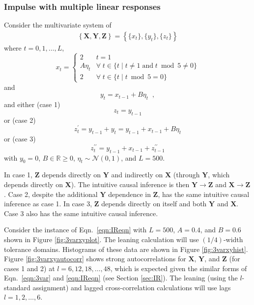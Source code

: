 \documentclass{article}[10pt]
\begin{document}
\subsubsection{Impulse with multiple linear responses}
\label{sec:3var}
Consider the multivariate system of
\begin{eqnarray}
\label{eqn:3var}
\left\{\mathbf{X},\mathbf{Y},\mathbf{Z}\right\} = \left\{\{x_t\},\{y_t\},\{z_t\}\right\}
\end{eqnarray}
where $t=0,1,\ldots,L$,
\begin{equation*}
x_t = \left\{
  \begin{array}{lr}
    2 & t = 1\\
    A\eta_t & \forall\; t\in\{t\;|\;t\neq 1 \;\mathrm{and}\; t\bmod 5 \neq 0\}\\
    2 & \forall\; t\in\{t\;|\;t\bmod 5 = 0\}
  \end{array}
\right.
\end{equation*}
and
\begin{equation*}
y_t = x_{t-1} + B\eta_t\;\;,
\end{equation*}
and either (case 1)
\begin{equation}
z_t = y_{t-1}
\end{equation}
or (case 2)
\begin{equation}
z_t^\prime = y_{t-1} + y_t = y_{t-1} + x_{t-1} + B\eta_t
\end{equation}
or (case 3)
\begin{equation}
z_t^{\prime\prime} = y_{t-1} + x_{t-1} + z_{t-1}^{\prime\prime}
\end{equation}
with $y_0 = 0$, $B\in\mathbb{R}\ge 0$, $\eta_t\sim\mathcal{N}\left(0,1\right)$, and $L=500$.

In case 1, $\mathbf{Z}$ depends directly on $\mathbf{Y}$ and indirectly on $\mathbf{X}$ (through $\mathbf{Y}$, which depends directly on $\mathbf{X}$).  The intuitive causal inference is then $\mathbf{Y}\rightarrow\mathbf{Z}$ and $\mathbf{X}\rightarrow\mathbf{Z}$.  Case 2, despite the additional $\mathbf{Y}$ dependence in $\mathbf{Z}$, has the same intuitive causal inference as case 1.  In case 3, $\mathbf{Z}$ depends directly on itself and both $\mathbf{Y}$ and $\mathbf{X}$.  Case 3 also has the same intuitive causal inference.

Consider the instance of Eqn.\ \ref{eqn:IReqn} with $L=500$, $A=0.4$, and $B=0.6$ shown in Figure \ref{fig:3varxyplot}.  The leaning calculation will use $(1/4)$-width tolerance domains.  Histograms of these data are shown in Figure \ref{fig:3varxyhist}.  Figure \ref{fig:3varxyautocorr} shows strong autocorrelations for $\mathbf{X}$, $\mathbf{Y}$, and $\mathbf{Z}$ (for cases 1 and 2) at $l=6,12,18,\ldots,48$, which is expected given the similar forms of Eqn.\ \ref{eqn:3var} and \ref{eqn:IReqn} (see Section \ref{sec:IR}).  The leaning (using the $l$-standard assignment) and lagged cross-correlation calculations will use lags $l=1,2,\ldots,6$.  
\end{document}
